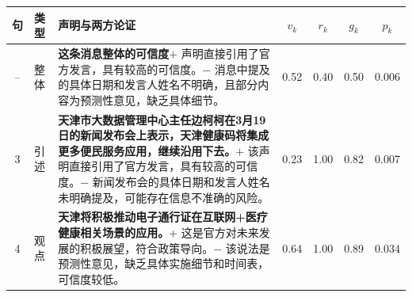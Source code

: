 {\small\begin{tabularx}{\linewidth}{@{}clXcccc@{}}
\toprule
句 & 类型 & 声明与两方论证 & $v_k$ & $r_k$ & $g_k$ & $p_k$ \\
\midrule
-- & 整体 & \textbf{这条消息整体的可信度}\newline $+$ 声明直接引用了官方发言，具有较高的可信度。\newline $-$ 消息中提及的具体日期和发言人姓名不明确，且部分内容为预测性意见，缺乏具体细节。 & 0.52 & 0.40 & 0.50 & 0.006 \\
3 & 引述 & \textbf{天津市大数据管理中心主任边柯柯在3月19日的新闻发布会上表示，天津健康码将集成更多便民服务应用，继续沿用下去。}\newline $+$ 该声明直接引用了官方发言，具有较高的可信度。\newline $-$ 新闻发布会的具体日期和发言人姓名未明确提及，可能存在信息不准确的风险。 & 0.23 & 1.00 & 0.82 & 0.007 \\
4 & 观点 & \textbf{天津将积极推动电子通行证在互联网+医疗健康相关场景的应用。}\newline $+$ 这是官方对未来发展的积极展望，符合政策导向。\newline $-$ 该说法是预测性意见，缺乏具体实施细节和时间表，可信度较低。 & 0.64 & 1.00 & 0.89 & 0.034 \\
\bottomrule
\end{tabularx}}
\par\medskip
